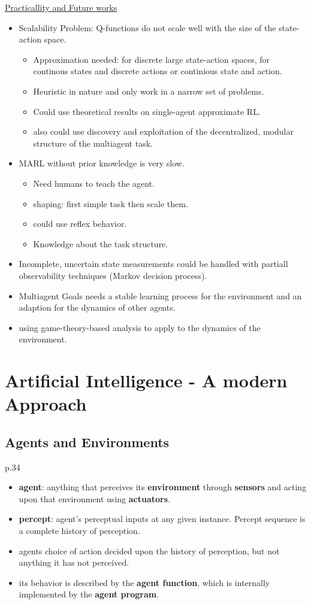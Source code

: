 \underline{Practicallity and Future works}
\begin{itemize}[noitemsep,nolistsep]
	\item Scalability Problem: Q-functions do not scale well with the size of the state-action space.
	\begin{itemize}[noitemsep,nolistsep]
		\item Approximation needed: for discrete large state-action spaces, for continous states and discrete actions or continious state and action.
		\item Heuristic in nature and only work in a narrow set of problems.
		\item Could use theoretical results on single-agent approximate RL.
		\item also could use discovery and exploitation of the decentralized, modular structure of the multiagent task.
	\end{itemize}
	\item MARL without prior knowledge is very slow.
	\begin{itemize}[noitemsep,nolistsep]
		\item Need humans to teach the agent.
		\item shaping: first simple task then scale them.
		\item could use reflex behavior.
		\item Knowledge about the task structure.
	\end{itemize}
	\item Incomplete, uncertain state measurements could be handled with partiall observability techniques (Markov decision process).
	\item Multiagent Goals needs a stable learning process for the environment and an adaption for the dynamics of other agents.
	\item using game-theory-based analysis to apply to the dynamics of the environment.
\end{itemize}

\section{Artificial Intelligence - A modern Approach}
\subsection{Agents and Environments}
p.34
\begin{itemize}[noitemsep,nolistsep]
	\item \textbf{agent}: anything that perceives its \textbf{environment} through \textbf{sensors} and acting upon that environment using \textbf{actuators}.
	\item \textbf{percept}: agent’s perceptual inputs at any given instance. Percept sequence is a complete history of perception.
	\item agents choice of action decided upon the history of perception, but not anything it has not perceived.
	\item its behavior is described by the \textbf{agent function}, which is internally implemented by the \textbf{agent program}.
\end{itemize}

